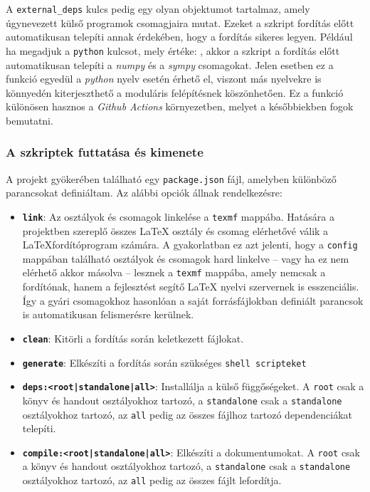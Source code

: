 A \texttt{external\_deps} kulcs pedig egy olyan objektumot tartalmaz, amely
úgynevezett külső programok csomagjaira mutat. Ezeket a szkript fordítás előtt
automatikusan telepíti annak érdekében, hogy a fordítás sikeres legyen. Például
ha megadjuk a \texttt{python} kulcsot, mely értéke:
,
akkor a szkript a fordítás előtt automatikusan telepíti a \textit{numpy} és a
\textit{sympy} csomagokat. Jelen esetben ez a funkció egyedül a
\textit{python} nyelv esetén érhető el, viszont más nyelvekre is könnyedén
kiterjeszthető a moduláris felépítésnek köszönhetően. Ez a funkció
különösen hasznos a \textit{Github Actions} környezetben, melyet a későbbiekben
fogok bemutatni.

\subsubsection{A szkriptek futtatása és kimenete}

A projekt gyökerében található egy \texttt{package.json} fájl, amelyben
különböző parancsokat definiáltam. Az alábbi opciók állnak rendelkezésre:

\begin{itemize}
	\item \textbf{\texttt{link}}:
	      Az osztályok és csomagok linkelése a \texttt{texmf} mappába.
	      Hatására a projektben szereplő összes \LaTeX{} osztály és csomag
	      elérhetővé válik a \LaTeX fordítóprogram számára. A gyakorlatban
	      ez azt jelenti, hogy a \texttt{config} mappában található osztályok
	      és csomagok hard linkelve -- vagy ha ez nem elérhető akkor másolva --
	      lesznek a \texttt{texmf} mappába, amely nemcsak a fordítónak,
	      hanem a fejlesztést segítő \LaTeX{} nyelvi szervernek is
	      esszenciális. Így a gyári csomagokhoz hasonlóan a saját forrásfájlokban
	      definiált parancsok is automatikusan felismerésre kerülnek.

	\item \textbf{\texttt{clean}}:
	      Kitörli a fordítás során keletkezett fájlokat.

	\item \textbf{\texttt{generate}}:
	      Elkészíti a fordítás során szükséges \texttt{shell scripteket}

	\item \textbf{\texttt{deps:<root|standalone|all>}}:
	      Installálja a külső függőségeket. A \texttt{root} csak a könyv és
	      handout osztályokhoz tartozó, a \texttt{standalone} csak a
	      \texttt{standalone} osztályokhoz tartozó, az \texttt{all} pedig
	      az összes fájlhoz tartozó dependenciákat telepíti.

	\item \textbf{\texttt{compile:<root|standalone|all>}}:
	      Elkészíti a dokumentumokat. A \texttt{root} csak a könyv és
	      handout osztályokhoz tartozó, a \texttt{standalone} csak a
	      \texttt{standalone} osztályokhoz tartozó, az \texttt{all} pedig
	      az összes fájlt lefordítja.
\end{itemize}

